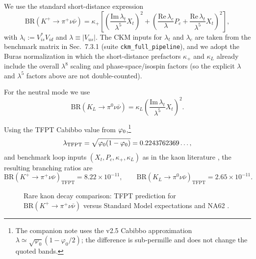 We use the standard short-distance expression
\begin{equation}
\mathrm{BR}(K^+ \to \pi^+ \nu\bar{\nu}) =
\kappa_+\left[
\left(\frac{\mathrm{Im}\,\lambda_t}{\lambda^5}X_t\right)^2+
\left(\frac{\mathrm{Re}\,\lambda_c}{\lambda}P_c+\frac{\mathrm{Re}\,\lambda_t}{\lambda^5}X_t\right)^2
\right],
\end{equation}
with $\lambda_i := V_{is}^\ast V_{id}$ and $\lambda \equiv |V_{us}|$. The CKM inputs for
$\lambda_t$ and $\lambda_c$ are taken from the benchmark matrix in Sec.~7.3.1
(suite \texttt{ckm\_full\_pipeline}), and we adopt the Buras normalization in which the
short-distance prefactors $\kappa_+$ and $\kappa_L$ already include the overall $\lambda^8$
scaling and phase-space/isospin factors (so the explicit $\lambda$ and $\lambda^5$ factors
above are not double-counted).

For the neutral mode we use
\begin{equation}
\mathrm{BR}(K_L \to \pi^0 \nu\bar{\nu}) =
\kappa_L\left(\frac{\mathrm{Im}\,\lambda_t}{\lambda^5}X_t\right)^2.
\end{equation}

Using the TFPT Cabibbo value from $\varphi_0$,\footnote{The companion note
\cite{rareKaonNote2025} uses the v2.5 Cabibbo approximation
$\lambda \simeq \sqrt{\varphi_0}(1-\varphi_0/2)$; the difference is sub-permille and does not
change the quoted bands.}
\begin{equation}
\lambda_{\mathrm{TFPT}}=\sqrt{\varphi_0(1-\varphi_0)}=0.2243762369\ldots,
\end{equation}
and benchmark loop inputs $(X_t,P_c,\kappa_+,\kappa_L)$ as in the kaon literature
\cite{brod2021,buras2022,na622024},
the resulting branching ratios are
\begin{equation}
\mathrm{BR}(K^+ \to \pi^+ \nu\bar{\nu})_{\mathrm{TFPT}} = 8.22\times 10^{-11},
\qquad
\mathrm{BR}(K_L \to \pi^0 \nu\bar{\nu})_{\mathrm{TFPT}} = 2.65\times 10^{-11}.
\end{equation}

\begin{figure}[H]
\centering
{}
\caption{Rare kaon decay comparison: TFPT prediction for $\mathrm{BR}(K^+ \to \pi^+ \nu\bar{\nu})$ versus Standard Model expectations and NA62 \cite{brod2021,buras2022,na622024}.}
\label{fig:kaon_bar}
\end{figure}

